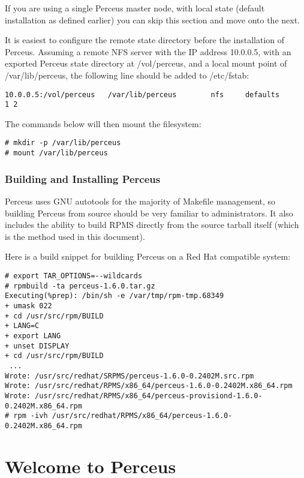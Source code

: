\documentclass[10pt,letterpaper]{report}
\begin{document}
If you are using a single Perceus master node, with local state (default
installation as defined earlier) you can skip this section and move onto the
next.

It is easiest to configure the remote state directory before the installation
of Perceus.  Assuming a remote NFS server with the IP address 10.0.0.5, with
an exported Perceus state directory at /vol/perceus, and a local mount point
of /var/lib/perceus, the following line should be added to /etc/fstab:

\begin{verbatim}
10.0.0.5:/vol/perceus   /var/lib/perceus        nfs     defaults        1 2
\end{verbatim}

\noindent The commands below will then mount the filesystem:

\begin{verbatim}
# mkdir -p /var/lib/perceus
# mount /var/lib/perceus
\end{verbatim}

\subsection{Building and Installing Perceus}

Perceus uses GNU autotools for the majority of Makefile management, so
building Perceus from source should be very familiar to administrators.  It
also includes the ability to build RPMS directly from the source tarball
itself (which is the method used in this document).

\noindent Here is a build snippet for building Perceus on a Red Hat compatible
system:

\begin{verbatim}
# export TAR_OPTIONS=--wildcards
# rpmbuild -ta perceus-1.6.0.tar.gz
Executing(%prep): /bin/sh -e /var/tmp/rpm-tmp.68349
+ umask 022
+ cd /usr/src/rpm/BUILD
+ LANG=C
+ export LANG
+ unset DISPLAY
+ cd /usr/src/rpm/BUILD
 ...
Wrote: /usr/src/redhat/SRPMS/perceus-1.6.0-0.2402M.src.rpm
Wrote: /usr/src/redhat/RPMS/x86_64/perceus-1.6.0-0.2402M.x86_64.rpm
Wrote: /usr/src/redhat/RPMS/x86_64/perceus-provisiond-1.6.0-0.2402M.x86_64.rpm
# rpm -ivh /usr/src/redhat/RPMS/x86_64/perceus-1.6.0-0.2402M.x86_64.rpm
\end{verbatim}

\chapter{Welcome to Perceus}
\end{document}

